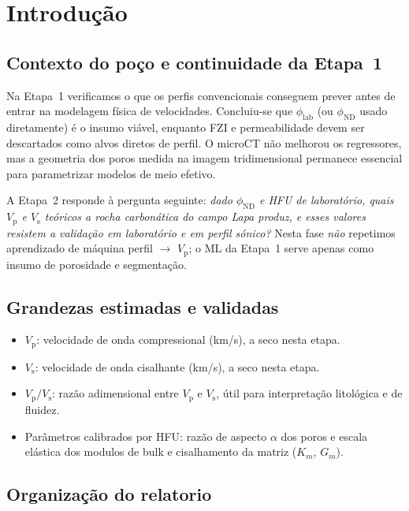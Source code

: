 \documentclass[11pt,a4paper]{article}
\numberwithin{equation}{section}
\newcommand{\philab}{\ensuremath{\phi_{\mathrm{lab}}}}
\newcommand{\phiND}{\ensuremath{\phi_{\mathrm{ND}}}}
\newcommand{\Vp}{\ensuremath{V_{\mathrm{p}}}}
\newcommand{\Vs}{\ensuremath{V_{\mathrm{s}}}}
\newcommand{\VpVs}{\ensuremath{V_{\mathrm{p}}/V_{\mathrm{s}}}}
\begin{document}
\section{Introdução}
\label{sec:intro}

\subsection{Contexto do poço e continuidade da Etapa~1}

Na Etapa~1 verificamos o que os perfis convencionais conseguem prever antes de
entrar na modelagem física de velocidades.
Concluiu-se que \philab{} (ou \phiND{} usado diretamente) é o insumo viável,
enquanto FZI e permeabilidade devem ser descartados como alvos diretos de
perfil.
O microCT não melhorou os regressores, mas a geometria dos poros medida na
imagem tridimensional permanece essencial para parametrizar modelos de meio
efetivo.

A Etapa~2 responde à pergunta seguinte: \emph{dado \phiND{} e HFU de
laboratório, quais \Vp{} e \Vs{} teóricos a rocha carbonática do campo Lapa
produz, e esses valores resistem a validação em laboratório e em
perfil sónico?}
Nesta fase \emph{não} repetimos aprendizado de máquina perfil $\rightarrow$
\Vp{}; o ML da Etapa~1 serve apenas como insumo de porosidade e segmentação.

\subsection{Grandezas estimadas e validadas}

\begin{itemize}
  \item \Vp: velocidade de onda compressional (km/s), a seco nesta etapa.
  \item \Vs: velocidade de onda cisalhante (km/s), a seco nesta etapa.
  \item \VpVs: razão adimensional entre \Vp{} e \Vs{}, útil para
        interpretação litológica e de fluidez.
  \item Parâmetros calibrados por HFU: razão de aspecto $\alpha$ dos poros
        e escala elástica dos modulos de bulk e cisalhamento da matriz
        ($K_m$, $G_m$).
\end{itemize}

\subsection{Organização do relatorio}
\end{document}
